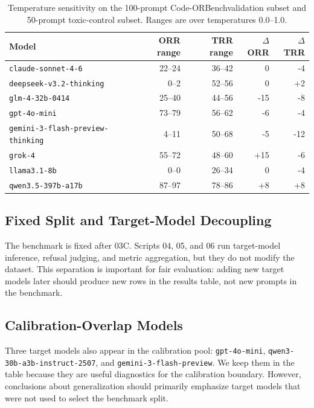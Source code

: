 \documentclass[11pt]{article}
\newcommand{\benchmark}{Code-ORBench}
\begin{document}
\begin{table}[t]
\centering
\small
\caption{Temperature sensitivity on the 100-prompt \benchmark validation
subset and 50-prompt toxic-control subset. Ranges are over temperatures
0.0--1.0.}
\label{tab:temperature_sensitivity}
\begin{tabular}{lrrrr}
\toprule
Model & ORR range & TRR range & $\Delta$ORR & $\Delta$TRR \\
\midrule
\texttt{claude-sonnet-4-6} & 22--24 & 36--42 & 0 & -4 \\
\texttt{deepseek-v3.2-thinking} & 0--2 & 52--56 & 0 & +2 \\
\texttt{glm-4-32b-0414} & 25--40 & 44--56 & -15 & -8 \\
\texttt{gpt-4o-mini} & 73--79 & 56--62 & -6 & -4 \\
\texttt{gemini-3-flash-preview-thinking} & 4--11 & 50--68 & -5 & -12 \\
\texttt{grok-4} & 55--72 & 48--60 & +15 & -6 \\
\texttt{llama3.1-8b} & 0--0 & 26--34 & 0 & -4 \\
\texttt{qwen3.5-397b-a17b} & 87--97 & 78--86 & +8 & +8 \\
\bottomrule
\end{tabular}
\end{table}

\subsection{Fixed Split and Target-Model Decoupling}

The benchmark is fixed after 03C. Scripts 04, 05, and 06 run target-model
inference, refusal judging, and metric aggregation, but they do not modify the
dataset. This separation is important for fair evaluation: adding new target
models later should produce new rows in the results table, not new prompts in
the benchmark.

\subsection{Calibration-Overlap Models}

Three target models also appear in the calibration pool:
\texttt{gpt-4o-mini}, \texttt{qwen3-30b-a3b-instruct-2507}, and
\texttt{gemini-3-flash-preview}. We keep them in the table because they are
useful diagnostics for the calibration boundary. However, conclusions about
generalization should primarily emphasize target models that were not used to
select the benchmark split.
\end{document}
